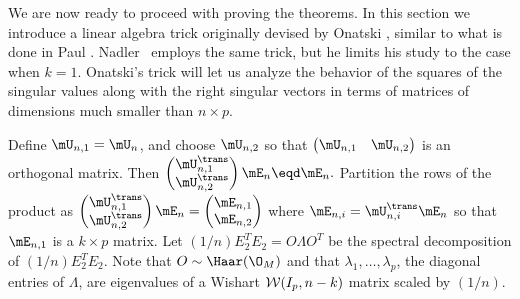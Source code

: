 We are now ready to proceed with proving the theorems.  In this section we introduce a linear algebra trick originally devised by Onatski \cite{onatski}, similar to what is done in Paul \cite{paul2007ase}.  Nadler~\cite{nadler2008fsa} employs the same trick, but he limits his study to the case when $k = 1$. Onatski's trick will let us analyze the behavior of the squares of the singular values along with the right singular vectors in terms of matrices of dimensions much smaller than $n \times p$.

Define $\mU_{n,1} = \mU_n$, and choose $\mU_{n,2}$ so that
\(
    \left( 
    \begin{matrix}
        \mU_{n,1} & \mU_{n,2}
    \end{matrix}
    \right)
\) 
is an orthogonal matrix. 
Then 
\(
    \left( 
    \begin{matrix}
        \mU_{n,1}^\trans \\
        \mU_{n,2}^\trans
    \end{matrix}
    \right)
    \mE_n
    \eqd
    \mE_n.
\)
Partition the rows of the product as
\(
    \left(
    \begin{matrix}
        \mU_{n,1}^\trans \\
        \mU_{n,2}^\trans
    \end{matrix}
    \right)
    \mE_n
    = 
    \left(
    \begin{matrix}
        \mE_{n,1} \\
        \mE_{n,2}
    \end{matrix}
    \right)
\)
where $\mE_{n,i} = \mU_{n,i}^\trans \mE_n$ so that $\mE_{n,1}$ is a $k \times p$ matrix.  Let $(1/n) E_2^T E_2 = O \Lambda O^T$ be the spectral decomposition of $(1/n) E_2^T E_2$.  Note that $O \sim \Haar(\O_M)$ and that $\lambda_1, \ldots, \lambda_p$, the diagonal entries of $\Lambda$, are eigenvalues of a Wishart $\mathcal{W}(I_p, n-k)$ matrix scaled by $(1/n)$.  


